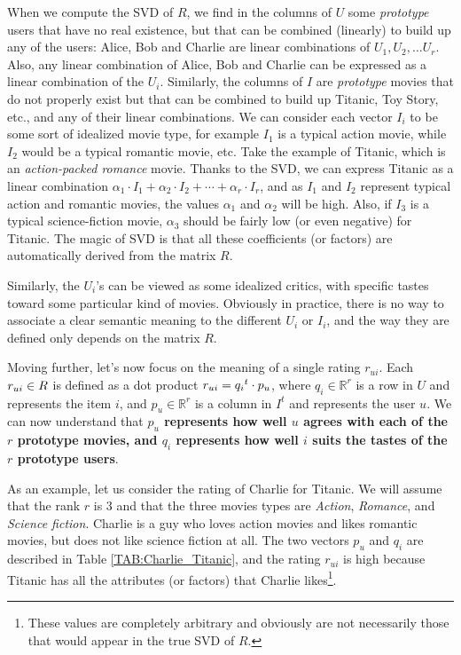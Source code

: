 When we compute the SVD of $R$, we find in the columns of $U$ some
\textit{prototype} users that have no real existence, but that can be combined
(linearly) to build up any of the users: Alice, Bob and Charlie are linear
combinations of $U_1, U_2, \dots U_r$. Also, any linear combination of Alice,
Bob and Charlie can be expressed as a linear combination of the $U_i$. Similarly, the columns of $I$ are
\textit{prototype} movies that do not properly exist but that can be combined
to build up Titanic, Toy Story, etc., and any of their linear combinations. We can consider each vector $I_i$
to be some sort of idealized movie type, for example $I_1$ is a typical action
movie, while $I_2$ would be a typical romantic movie, etc. Take the example of
Titanic, which is an \textit{action-packed romance} movie. Thanks to the SVD,
we can express Titanic  as a linear combination $\alpha_1 \cdot I_1 + \alpha_2
\cdot I_2 + \cdots + \alpha_r \cdot I_r$, and as $I_1$ and $I_2$ represent
typical action and romantic movies, the values $\alpha_1$ and $\alpha_2$
will be high. Also, if
$I_3$ is a typical science-fiction movie, $\alpha_3$ should be fairly low (or
even negative) for Titanic. The magic of SVD is that all these coefficients (or factors)
are automatically derived from the matrix $R$.

Similarly, the $U_i$'s can be viewed as some idealized critics, with specific
tastes toward some particular kind of movies. Obviously in practice, there is
no way to associate a clear semantic meaning to the different $U_i$ or $I_i$,
and the way they are defined only depends on the matrix $R$.

Moving further, let's now focus on the meaning of a single rating $r_{ui}$.
Each $r_{ui} \in R$ is defined as a dot product $r_{ui} =
{q_i}^t \cdot p_u$, where $q_i \in \mathbb{R}^r$ is a row in $U$ and represents
the item $i$, and $p_u \in \mathbb{R}^r$ is a column in $I^t$ and represents the
user $u$. We can now understand that \textbf{$p_u$ represents how well $u$
agrees with each of the $r$ prototype movies, and $q_i$ represents how well $i$
suits the tastes of the $r$ prototype users}.

\begin{testexample}
As an example, let us consider the rating of Charlie for Titanic. We will
assume that the rank $r$ is $3$ and that the three movies types are
\textit{Action}, \textit{Romance}, and \textit{Science fiction}. Charlie is a
guy who loves action movies and likes romantic movies, but does not like
science fiction at all. The two vectors $p_u$ and $q_i$ are described in Table
\ref{TAB:Charlie_Titanic}, and the rating $r_{ui}$ is high because Titanic
has all the attributes (or factors) that Charlie likes\footnote{These values
are completely arbitrary and obviously are not necessarily those that would
appear in the true SVD of $R$.}.
\end{testexample}


